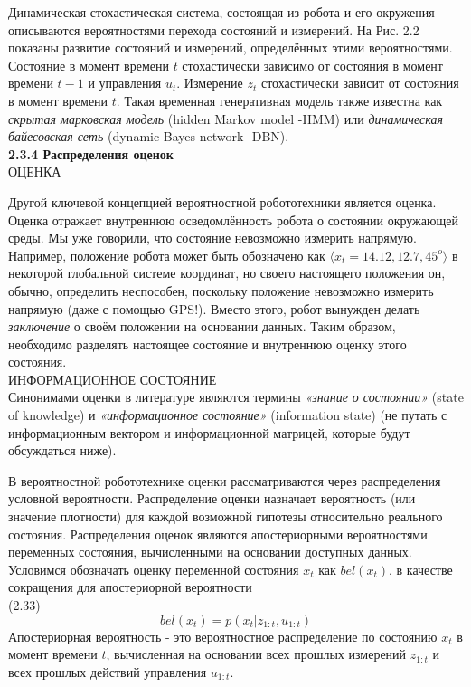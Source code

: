 \documentclass[10pt,a4paper]{article}
\begin{document}
 Динамическая стохастическая система, состоящая из робота и его окружения описываются вероятностями перехода состояний и измерений. На Рис. 2.2 показаны развитие состояний и измерений, определённых этими вероятностями. Состояние в момент времени $t$  стохастически зависимо от состояния в момент времени ${t-1}$ и управления $u_t$. Измерение $z_t$ стохастически зависит от состояния в момент времени $t$. Такая временная генеративная модель также известна как \textit{скрытая марковская модель} 
 (hidden Markov model -HMM) или \textit{динамическая байесовская сеть} (dynamic Bayes network -DBN).\\
 
\textbf{ 2.3.4 Распределения оценок}\\

 ОЦЕНКА
 
 Другой ключевой концепцией вероятностной робототехники является оценка. Оценка отражает внутреннюю осведомлённость робота о состоянии окружающей среды. Мы уже говорили, что состояние невозможно измерить напрямую.  Например, положение робота может быть обозначено как $\langle x_t = 14.12, 12.7, 45^o\rangle$ в некоторой глобальной системе координат, но своего настоящего положения он, обычно, определить неспособен, поскольку положение невозможно измерить напрямую (даже с помощью GPS!). Вместо этого, робот вынужден делать \textit{заключение} о своём положении на основании данных. Таким образом, необходимо разделять настоящее состояние и внутреннюю оценку этого состояния.\\
 ИНФОРМАЦИОННОЕ СОСТОЯНИЕ\\ 
 Синонимами оценки в литературе являются термины \textit{«знание о состоянии»} (state of knowledge) и \textit{«информационное состояние»} (information state) (не путать с информационным вектором и информационной матрицей, которые будут обсуждаться ниже).
 
 В вероятностной робототехнике оценки рассматриваются через распределения условной вероятности. Распределение оценки назначает вероятность (или значение плотности) для каждой возможной гипотезы относительно реального состояния. Распределения оценок являются апостериорными вероятностями переменных состояния, вычисленными на основании доступных данных. Условимся обозначать оценку переменной состояния $x_t$ как $bel(x_t)$, в качестве сокращения для апостериорной вероятности\\

 (2.33) $$bel(x_t) = p(x_t | z_{1:t}, u_{1:t})$$
 Апостериорная вероятность  - это вероятностное распределение по состоянию $x_t$ в момент времени $t$, вычисленная на основании всех прошлых измерений $z_{1:t}$ и всех прошлых действий управления $u_{1:t}$.
 
\end{document}
